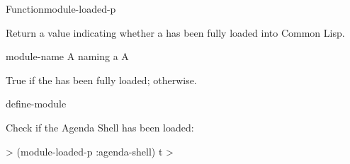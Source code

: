 \documentclass[10pt,twoside,english,pdftex]{article}
\begin{document}
\begin{functiondoc}{Function}{module-loaded-p}{%
    }
%
%

\fnsyntax 

\fnpurpose Return a value indicating whether a  has been fully
loaded into Common Lisp.

\fnpackage {}

\fnmodule {}

\fnargs
\begin{args}{module-name}
 A  naming a 
\arg[boolean] A 
\end{args}

\fnreturns True if the  has been fully loaded; \nil{} otherwise.

\fnerrors
\modulenotdefined

\begin{alsos}{define-module}
\end{alsos}

\fnexample
Check if the Agenda Shell  has been loaded:
%
\begin{example}
\W\supp
  > (module-loaded-p :agenda-shell)
  t
  >
\end{example} 

\end{functiondoc}

\end{document}
